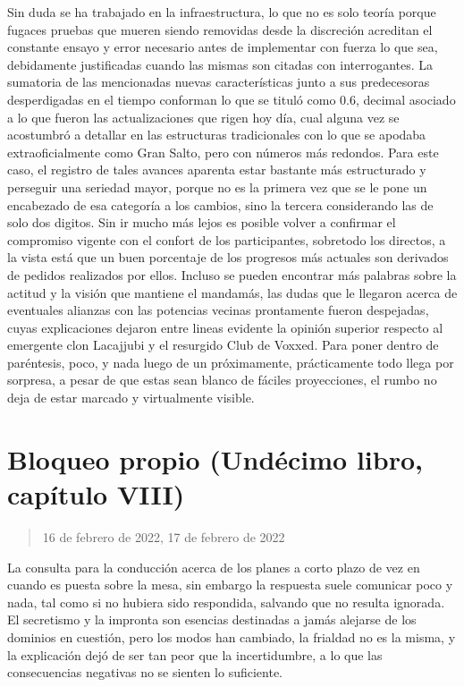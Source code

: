 \documentclass[
]{book}
\begin{document}
Sin duda se ha trabajado en la infraestructura, lo que no es solo teoría porque fugaces pruebas que mueren siendo removidas desde la discreción acreditan el constante ensayo y error necesario antes de implementar con fuerza lo que sea, debidamente justificadas cuando las mismas son citadas con interrogantes. La sumatoria de las mencionadas nuevas características junto a sus predecesoras desperdigadas en el tiempo conforman lo que se tituló como 0.6, decimal asociado a lo que fueron las actualizaciones que rigen hoy día, cual alguna vez se acostumbró a detallar en las estructuras tradicionales con lo que se apodaba extraoficialmente como Gran Salto, pero con números más redondos. Para este caso, el registro de tales avances aparenta estar bastante más estructurado y perseguir una seriedad mayor, porque no es la primera vez que se le pone un encabezado de esa categoría a los cambios, sino la tercera considerando las de solo dos digitos. Sin ir mucho más lejos es posible volver a confirmar el compromiso vigente con el confort de los participantes, sobretodo los directos, a la vista está que un buen porcentaje de los progresos más actuales son derivados de pedidos realizados por ellos. Incluso se pueden encontrar más palabras sobre la actitud y la visión que mantiene el mandamás, las dudas que le llegaron acerca de eventuales alianzas con las potencias vecinas prontamente fueron despejadas, cuyas explicaciones dejaron entre lineas evidente la opinión superior respecto al emergente clon Lacajjubi y el resurgido Club de Voxxed. Para poner dentro de paréntesis, poco, y nada luego de un próximamente, prácticamente todo llega por sorpresa, a pesar de que estas sean blanco de fáciles proyecciones, el rumbo no deja de estar marcado y virtualmente visible.

\hypertarget{bloqueo-propio-unduxe9cimo-libro-capuxedtulo-viii}{%
\section{Bloqueo propio (Undécimo libro, capítulo VIII)}\label{bloqueo-propio-unduxe9cimo-libro-capuxedtulo-viii}}

\begin{quote}
16 de febrero de 2022, 17 de febrero de 2022
\end{quote}

La consulta para la conducción acerca de los planes a corto plazo de vez en cuando es puesta sobre la mesa, sin embargo la respuesta suele comunicar poco y nada, tal como si no hubiera sido respondida, salvando que no resulta ignorada. El secretismo y la impronta son esencias destinadas a jamás alejarse de los dominios en cuestión, pero los modos han cambiado, la frialdad no es la misma, y la explicación dejó de ser tan peor que la incertidumbre, a lo que las consecuencias negativas no se sienten lo suficiente.
\end{document}
